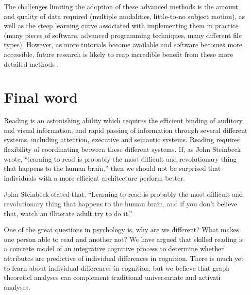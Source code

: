 The challenges limiting the adoption of these advanced methods is the amount and quality of data required (multiple modalities, little-to-no subject motion), as well as the steep learning curve associated with implementing them in practice (many pieces of software, advanced programming techniques, many different file types). However, as more tutorials become available and software becomes more accessible, future research is likely to reap incredible benefit from these more detailed methods \citep{Poldrack2015}.

\section{Final word}

Reading is an astonishing ability which requires the efficient binding of auditory and visual information, and rapid passing of information through several different systems, including attention, executive and semantic systems.  Reading requires flexibility of coordinating between these different systems. If, as John Steinbeck wrote, ``learning to read is probably the most difficult and revolutionary thing that happens to the human brain,'' then we should not be surprised that individuals with a more efficient architecture perform better. 

John Steinbeck stated that, ``Learning to read is probably the most difficult and revolutionary thing that happens to the human brain, and if you don't believe that, watch an illiterate adult try to do it.''


One of the great questions in psychology is, why are we different? What makes one person able to read and another not? We have argued that skilled reading is a concrete model of an integrative cognitive process to determine whether attributes are predictive of individual differences in cognition. There is much yet to learn about individual differences in cognition, but we believe that graph theoreticl analyses can complement traditional universariate and activati analyses. 